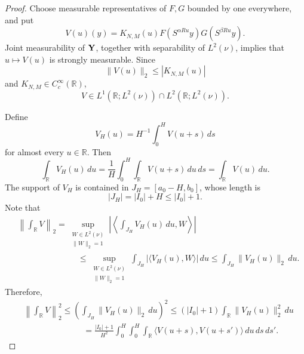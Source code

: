 \documentclass[reqno,12pt]{amsart}
\newtheorem{prop}[thm]{Proposition}
\def \R {\mathbb R}
\numberwithin{equation}{section}
\begin{document}
\begin{prop}\label[prop]{prop3:scalar}
Under the assumptions of \Cref{thm3-1}, for every real
$H\in(0,1]$,
\begin{equation}
 \left\|\int_\R K_{N,M}(u)
 F(S^{\alpha Ru})G(S^{\beta Ru})\,du\right\|_2^2
 \lesssim_{|I_0|}\frac1H\int_0^H
                \sup_{\xi\in\R}|\mathcal A_h(\xi)|\,dh.
 \label{eq3-add-spectral-reduction}
\end{equation}
\end{prop}
\begin{proof}
Choose measurable representatives of $F,G$ bounded by one everywhere,
and put
\[
 V(u)(y)=K_{N,M}(u)F(S^{\alpha Ru}y)G(S^{\beta Ru}y).
\]
Joint measurability of ${\bf Y}$, together with separability of $L^2(\nu)$, implies that $u\mapsto V(u)$ is strongly measurable. Since $$\|V(u)\|_2\le|K_{N,M}(u)|$$ and $K_{N,M}\in C_c^\infty(\R)$,\[
 V\in L^1(\R;L^2(\nu))\cap L^2(\R;L^2(\nu)).
\]

Define
$$V_H(u)=H^{-1}\int_0^H V(u+s)\,ds$$ for almost every $u\in\R$. Then
$$\int_\R V_H(u)\,du=\frac1H\int_0^H\int_\R V(u+s)\,du\,ds=\int_\R V(u)\,du.$$
The support of $V_H$ is contained in $J_H=[a_0-H,b_0]$, whose length is
$$|J_H|=|I_0|+H\le |I_0|+1.$$ 
Note that 
\begin{align*}
& \left\|\int_\R V\right\|_2=\sup_{\substack{W\in L^2(\nu)\\ \|W\|_2=1}} \left|\left\langle\int_{J_H}V_H(u)\,du,W\right\rangle\right|
\\ & \hspace{3cm}\le\sup_{\substack{W\in L^2(\nu)\\ \|W\|_2=1}}
\int_{J_H}|\langle V_H(u),W\rangle|\,du
\le\int_{J_H}\|V_H(u)\|_2\,du.
\end{align*}
Therefore,
\begin{align*}
 &\left\|\int_\R V\right\|_2^2
 \le \left(\int_{J_H}\|V_H(u)\|_2\,du\right)^2
 \le (|I_0|+1)\int_\R\|V_H(u)\|_2^2\,du\\
 &\hspace{3cm}=\frac{|I_0|+1}{H^2}\int_0^H\int_0^H\int_\R
       \langle V(u+s),V(u+s')\rangle\,du\,ds\,ds'.
\end{align*}


\end{proof}
\end{document}
